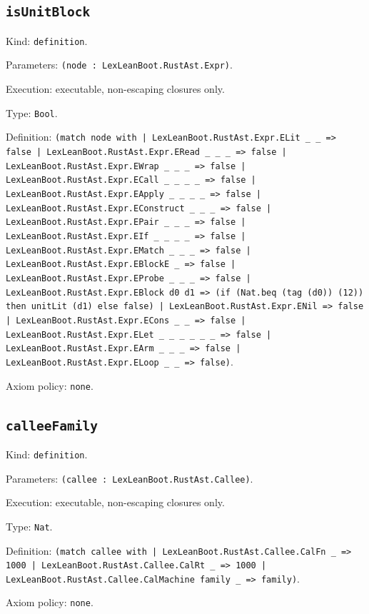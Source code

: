 \documentclass[11pt]{article}
\begin{document}
\subsection*{\texttt{isUnitBlock}}
\noindent Kind: \texttt{definition}.\par
\noindent Parameters: \texttt{(node : LexLeanBoot.RustAst.Expr)}.\par
\noindent Execution: executable, non-escaping closures only.\par
\noindent Type: \texttt{Bool}.\par
\noindent Definition: \texttt{(match node with | LexLeanBoot.RustAst.Expr.ELit \_ \_ => false | LexLeanBoot.RustAst.Expr.ERead \_ \_ \_ => false | LexLeanBoot.RustAst.Expr.EWrap \_ \_ \_ => false | LexLeanBoot.RustAst.Expr.ECall \_ \_ \_ \_ => false | LexLeanBoot.RustAst.Expr.EApply \_ \_ \_ \_ => false | LexLeanBoot.RustAst.Expr.EConstruct \_ \_ \_ => false | LexLeanBoot.RustAst.Expr.EPair \_ \_ \_ => false | LexLeanBoot.RustAst.Expr.EIf \_ \_ \_ \_ => false | LexLeanBoot.RustAst.Expr.EMatch \_ \_ \_ => false | LexLeanBoot.RustAst.Expr.EBlockE \_ => false | LexLeanBoot.RustAst.Expr.EProbe \_ \_ \_ => false | LexLeanBoot.RustAst.Expr.EBlock d0 d1 => (if (Nat.beq (tag (d0)) (12)) then unitLit (d1) else false) | LexLeanBoot.RustAst.Expr.ENil => false | LexLeanBoot.RustAst.Expr.ECons \_ \_ => false | LexLeanBoot.RustAst.Expr.ELet \_ \_ \_ \_ \_ \_ => false | LexLeanBoot.RustAst.Expr.EArm \_ \_ \_ => false | LexLeanBoot.RustAst.Expr.ELoop \_ \_ => false)}.\par
\noindent Axiom policy: \texttt{none}.\par
\subsection*{\texttt{calleeFamily}}
\noindent Kind: \texttt{definition}.\par
\noindent Parameters: \texttt{(callee : LexLeanBoot.RustAst.Callee)}.\par
\noindent Execution: executable, non-escaping closures only.\par
\noindent Type: \texttt{Nat}.\par
\noindent Definition: \texttt{(match callee with | LexLeanBoot.RustAst.Callee.CalFn \_ => 1000 | LexLeanBoot.RustAst.Callee.CalRt \_ => 1000 | LexLeanBoot.RustAst.Callee.CalMachine family \_ => family)}.\par
\noindent Axiom policy: \texttt{none}.\par
\end{document}
